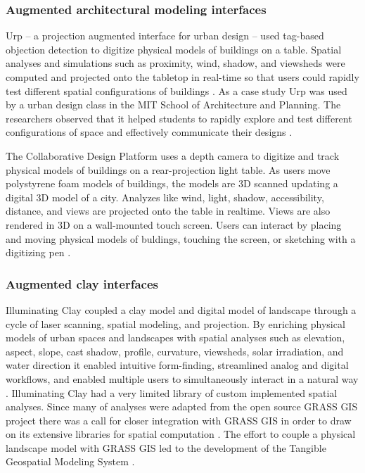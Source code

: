 \documentclass[prodmode,acmtochi]{acmsmall} %
\begin{document}
\subsubsection{Augmented architectural modeling interfaces}
Urp 
-- a projection augmented interface 
for urban design --
used tag-based objection detection to digitize 
physical models of buildings on a table. 
Spatial analyses and simulations such as
proximity, wind, shadow, and viewsheds 
were computed and projected onto the tabletop
in real-time so that users could
rapidly test different spatial configurations of buildings
\cite{Underkoffler1999}.
As a case study Urp was used by a urban design class
in the MIT School of Architecture and Planning.
The researchers observed that it helped students to
rapidly explore and test different configurations of space
and effectively communicate their designs
\cite{Ishii2002}. 

The Collaborative Design Platform uses 
a depth camera to digitize and track physical models of buildings
on a rear-projection light table. 
As users move polystyrene foam models of buildings,
the models are 3D scanned 
updating a digital 3D model of a city.
Analyzes like
wind, light, shadow, accessibility, distance, and views
are projected onto the table in realtime. 
Views are also rendered in 3D 
on a wall-mounted touch screen.
Users can interact by 
placing and moving physical models of buldings,
touching the screen, or sketching with a digitizing pen
\cite{Schubert2015}.

\subsubsection{Augmented clay interfaces}
Illuminating Clay coupled a clay model and digital model of landscape 
through a cycle of laser scanning, spatial modeling, and projection.
By enriching physical models of urban spaces and landscapes 
with spatial analyses  
such as 
elevation, aspect, slope, cast shadow, profile, curvature, 
viewsheds, solar irradiation, and water direction
it enabled
intuitive form-finding, 
streamlined analog and digital workflows, 
and enabled multiple users to simultaneously interact in a natural way \cite{Ratti2004}. 
Illuminating Clay had a very limited library of custom implemented spatial analyses. 
Since many of analyses were adapted 
from the open source GRASS GIS project \cite{Piper2002a} 
there was a call for closer integration with GRASS GIS 
in order to draw on its extensive libraries 
for spatial computation \cite{Piper2002b}. 
The effort to couple a physical landscape model with GRASS GIS \cite{Mitasova2006} 
led to the development of 
the Tangible Geospatial Modeling System
 \cite{Tateosian2010}.
\end{document}
